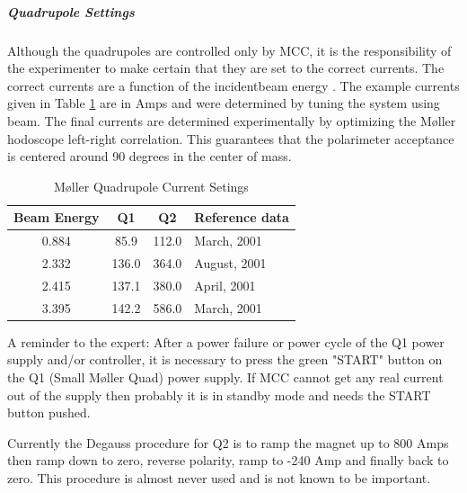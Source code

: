\subparagraph{Quadrupole Settings}

Although the quadrupoles are controlled only by MCC, it is the 
responsibility of the experimenter to make certain that they are
set to the correct currents.
The correct currents are a function of the incidentbeam energy . The example currents given in Table \ref{tab_qcurrent} are in Amps
and were determined by tuning the system using beam. The final currents 
are determined experimentally by optimizing the
M\o ller hodoscope left-right correlation. This guarantees that the polarimeter
acceptance is centered around 90 degrees in the center of mass.
%
\begin{table}[!hbt]
\begin{center}
\begin{tabular}{|c|c|c|l|} \hline
Beam Energy & Q1  & Q2 &Reference data \\
\hline
0.884 &  85.9 & 112.0 & March, 2001  \\
2.332 & 136.0 & 364.0 & August, 2001 \\
2.415 & 137.1 & 380.0 & April, 2001  \\
3.395 & 142.2 & 586.0 & March, 2001  \\
\hline 
\end{tabular}
\caption{M\o ller Quadrupole Current Setings\label{tab_qcurrent}}
\end{center}
\end{table}

A reminder to the expert: After a power failure or power cycle of the Q1 
power supply and/or controller,
it is necessary to press the green "START" button on the Q1 (Small
M\o ller Quad) power supply.  If MCC cannot get any real current out of the
supply then probably it is in standby mode and needs the START button pushed.

Currently the Degauss procedure for Q2 is to ramp the magnet up to 800 Amps 
then ramp down to zero, reverse polarity, ramp to -240 Amp and finally
back to zero. This procedure is almost never used and is not known to
be important.

